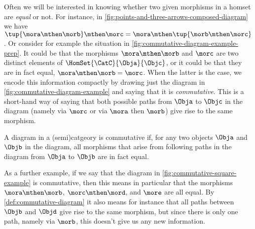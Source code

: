 Often we will be interested in knowing whether two given morphisms in a homset are \emph{equal} or not. For instance, in \cref{fig:points-and-three-arrows-composed-diagram} we have $\tup{\mora \mthen \morb} \mthen \morc = \mora \mthen \tup{\morb \mthen \morc}$. Or consider for example the situation in \cref{fig:commutative-diagram-example-prep}. It could be that the morphisms $\mora \mthen \morb$ and $\morc$ are two distinct elements of $\HomSet{\CatC}{\Obja}{\Objc}$, or it could be that they are in fact equal,  $\mora \mthen \morb = \morc$. When the latter is the case, we encode this information compactly by drawing just the diagram in \cref{fig:commutative-diagram-example} and saying that it is \emph{commutative}. This is a short-hand way of saying that both possible paths from $\Obja$ to $\Objc$ in the diagram (namely via $\morc$ or via $\mora$ then $\morb$) give rise to the same morphism. 

\begin{marginfigure}
    \centering
    \caption{}
    \label{fig:commutative-diagram-example-prep}
\end{marginfigure}

\begin{marginfigure}
    \centering
    \caption{}
    \label{fig:commutative-diagram-example}
\end{marginfigure}

\begin{marginfigure}
    \centering
    \caption{}
    \label{fig:commutative-square-example}
\end{marginfigure}

\begin{marginfigure}
    \centering
    \caption{}
    \label{fig:commutative-diagram-with-identity}
\end{marginfigure}


\begin{definition}\label{def:commutative-diagram}
A diagram in a (semi)catgeory is commutative if, for any two objects $\Obja$ and $\Objb$ in the diagram, all morphisms that arise from following paths in the diagram from $\Obja$ to $\Objb$ are in fact equal. 
\end{definition}

As a further example, if we say that the diagram in \cref{fig:commutative-square-example} is commutative, then this means in particular that the morphisms $\mora \mthen \morb$, $\morc \mthen \mord$, and $\more$ are all equal. By \cref{def:commutative-diagram} it also means for instance that all paths between $\Objb$ and $\Objd$ give rise to the same morphism, but since there is only one path, namely via $\morb$, this doesn't give us any new information.

